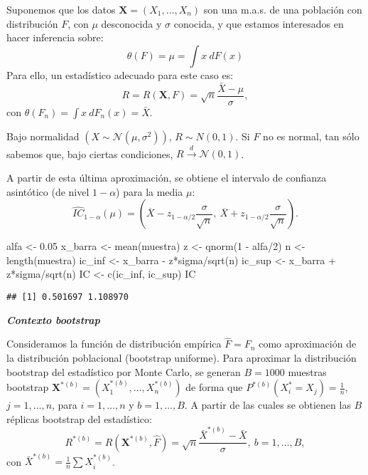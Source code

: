 \documentclass[
]{book}
\newenvironment{Shaded}{\begin{snugshade}}{\end{snugshade}}
\newcommand{\DecValTok}[1]{\textcolor[rgb]{0.00,0.00,0.81}{#1}}
\newcommand{\FloatTok}[1]{\textcolor[rgb]{0.00,0.00,0.81}{#1}}
\newcommand{\FunctionTok}[1]{\textcolor[rgb]{0.00,0.00,0.00}{#1}}
\newcommand{\NormalTok}[1]{#1}
\newcommand{\OtherTok}[1]{\textcolor[rgb]{0.56,0.35,0.01}{#1}}
\newcommand{\SpecialCharTok}[1]{\textcolor[rgb]{0.00,0.00,0.00}{#1}}
\theoremstyle{break}
\theoremstyle{definition}
\theoremstyle{definition}
\theoremstyle{definition}
\theoremstyle{definition}
\theoremstyle{remark}
\begin{document}
Suponemos que los datos \(\mathbf{X}=\left( X_1,\ldots ,X_n \right)\) son una m.a.s.
de una población con distribución \(F\), con \(\mu\) desconocida y \(\sigma\) conocida,
y que estamos interesados en hacer inferencia sobre:
\[\theta \left( F \right) =\mu =\int x~dF\left( x \right)\]
Para ello, un estadístico adecuado para este caso es:
\[R=R\left( \mathbf{X},F \right) =\sqrt{n}\frac{\bar{X}-\mu }{\sigma},\]
con \(\theta \left( F_n \right) =\int x~dF_n\left( x \right) = \bar{X}\).

Bajo normalidad \(\left( X\sim \mathcal{N}\left( \mu ,\sigma^2 \right) \right)\),
\(R\sim N\left( 0,1 \right)\). Si \(F\) no es normal, tan sólo sabemos que,
bajo ciertas condiciones,
\(R\overset{d}{\rightarrow }\mathcal{N}\left( 0, 1 \right)\).

A partir de esta última aproximación, se obtiene el intervalo de
confianza asintótico (de nivel \(1-\alpha\)) para la media \(\mu\):
\[\hat{IC}_{1-\alpha}\left(  \mu\right)  = 
\left(  \overline{X}-z_{1-\alpha/2}\dfrac{\sigma}{\sqrt{n}},\ \overline{X} 
+ z_{1-\alpha/2}\dfrac{\sigma}{\sqrt{n}} \right).\]

\begin{Shaded}
\begin{Highlighting}[]
\NormalTok{alfa }\OtherTok{\textless{}{-}} \FloatTok{0.05}
\NormalTok{x\_barra }\OtherTok{\textless{}{-}} \FunctionTok{mean}\NormalTok{(muestra)}
\NormalTok{z }\OtherTok{\textless{}{-}} \FunctionTok{qnorm}\NormalTok{(}\DecValTok{1} \SpecialCharTok{{-}}\NormalTok{ alfa}\SpecialCharTok{/}\DecValTok{2}\NormalTok{)}
\NormalTok{n }\OtherTok{\textless{}{-}} \FunctionTok{length}\NormalTok{(muestra)}
\NormalTok{ic\_inf }\OtherTok{\textless{}{-}}\NormalTok{ x\_barra }\SpecialCharTok{{-}}\NormalTok{ z}\SpecialCharTok{*}\NormalTok{sigma}\SpecialCharTok{/}\FunctionTok{sqrt}\NormalTok{(n)}
\NormalTok{ic\_sup }\OtherTok{\textless{}{-}}\NormalTok{ x\_barra }\SpecialCharTok{+}\NormalTok{ z}\SpecialCharTok{*}\NormalTok{sigma}\SpecialCharTok{/}\FunctionTok{sqrt}\NormalTok{(n)}
\NormalTok{IC }\OtherTok{\textless{}{-}} \FunctionTok{c}\NormalTok{(ic\_inf, ic\_sup)}
\NormalTok{IC}
\end{Highlighting}
\end{Shaded}

\begin{verbatim}
## [1] 0.501697 1.108970
\end{verbatim}

\textbf{\emph{Contexto bootstrap}}

Consideramos la función de distribución empírica \(\hat{F}=F_n\)
como aproximación de la distribución poblacional (bootstrap uniforme).
Para aproximar la distribución bootstrap del estadístico por Monte Carlo,
se generan \(B=1000\) muestras bootstrap
\(\mathbf{X}^{\ast (b)}=\left( X_1^{\ast (b)},\ldots ,X_n^{\ast (b)} \right)\)
de forma que
\(P^{\ast (b)}\left( X_i^{\ast}=X_j \right) = \frac{1}{n}\), \(j=1,\ldots ,n\), para \(i=1,\ldots, n\) y \(b=1,\ldots, B\).
A partir de las cuales se obtienen las \(B\) réplicas bootstrap del estadístico:
\[R^{\ast (b)}=R\left( \mathbf{X}^{\ast (b)},\hat{F} \right) =\sqrt{n}\frac{
\bar{X}^{\ast  (b)}-\bar{X}}{\sigma }, \ b=1,\ldots, B, \]
con \(\bar{X}^{\ast (b)} = \frac{1}{n}\sum X_i^{\ast (b)}\).
\end{document}

